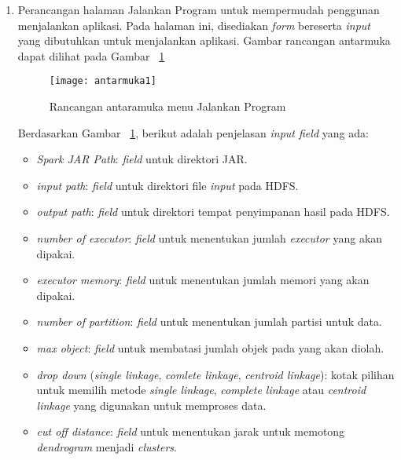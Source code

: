 \begin{enumerate}

\item Perancangan halaman Jalankan Program untuk mempermudah penggunan menjalankan aplikasi. Pada halaman ini, disediakan \textit{form} bereserta \textit{input} yang dibutuhkan untuk menjalankan aplikasi. Gambar rancangan antarmuka dapat dilihat pada Gambar ~\ref{fig:antarmuka1}

\begin{figure}[H]
    \centering  
    \texttt{[image: antarmuka1]}  
    \caption[Rancangan antaramuka menu Jalankan Program]{Rancangan antaramuka menu Jalankan Program} 
    \label{fig:antarmuka1} 
\end{figure}

Berdasarkan Gambar ~\ref{fig:antarmuka1}, berikut adalah penjelasan \textit{input field} yang ada:

\begin{itemize}
\item \textit{Spark JAR Path}: \textit{field} untuk direktori JAR.

\item \textit{input path}: \textit{field} untuk direktori file \textit{input} pada HDFS.

\item \textit{output path}: \textit{field} untuk direktori tempat penyimpanan hasil pada HDFS.

\item \textit{number of executor}: \textit{field} untuk menentukan jumlah \textit{executor} yang akan dipakai.

\item \textit{executor memory}: \textit{field} untuk menentukan jumlah memori yang akan dipakai.

\item \textit{number of partition}: \textit{field} untuk menentukan jumlah partisi untuk data.

\item \textit{max object}: \textit{field} untuk membatasi jumlah objek pada yang akan diolah.

\item \textit{drop down} (\textit{single linkage}, \textit{comlete linkage}, \textit{centroid linkage}): kotak pilihan untuk memilih  metode \textit{single linkage}, \textit{complete linkage} atau \textit{centroid linkage} yang digunakan untuk memproses data.

\item \textit{cut off distance}: \textit{field} untuk menentukan jarak untuk memotong \textit{dendrogram} menjadi \textit{clusters}.


\end{itemize}
\end{enumerate}
